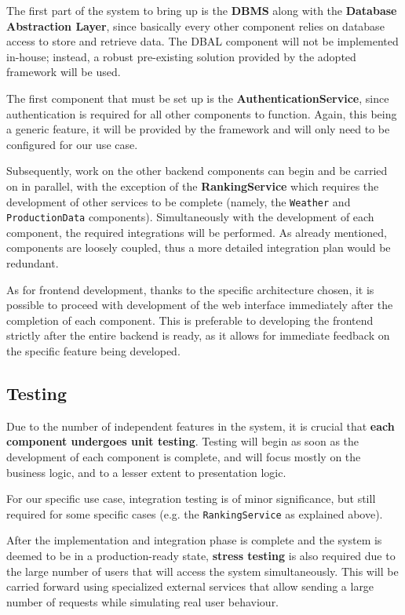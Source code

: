 \documentclass{article}
\begin{document}
\par The first part of the system to bring up is the \textbf{DBMS} along with the \textbf{Database Abstraction Layer}, since basically every other component relies on database access to store and retrieve data. The DBAL component will not be implemented in-house; instead, a robust pre-existing solution provided by the adopted framework will be used.

\par The first component that must be set up is the \textbf{AuthenticationService}, since authentication is required for all other components to function. Again, this being a generic feature, it will be provided by the framework and will only need to be configured for our use case.

\par Subsequently, work on the other backend components can begin and be carried on in parallel, with the exception of the \textbf{RankingService} which requires the development of other services to be complete (namely, the \verb|Weather| and \verb|ProductionData| components). Simultaneously with the development of each component, the required integrations will be performed. As already mentioned, components are loosely coupled, thus a more detailed integration plan would be redundant.

\par As for frontend development, thanks to the specific architecture chosen, it is possible to proceed with development of the web interface immediately after the completion of each component. This is preferable to developing the frontend strictly after the entire backend is ready, as it allows for immediate feedback on the specific feature being developed.

\subsection{Testing}
Due to the number of independent features in the system, it is crucial that \textbf{each component undergoes unit testing}. Testing will begin as soon as the development of each component is complete, and will focus mostly on the business logic, and to a lesser extent to presentation logic.

\par For our specific use case, integration testing is of minor significance, but still required for some specific cases (e.g. the \verb|RankingService| as explained above).

\par After the implementation and integration phase is complete and the system is deemed to be in a production-ready state, \textbf{stress testing} is also required due to the large number of users that will access the system simultaneously. This will be carried forward using specialized external services that allow sending a large number of requests while simulating real user behaviour.
\newpage
\end{document}
